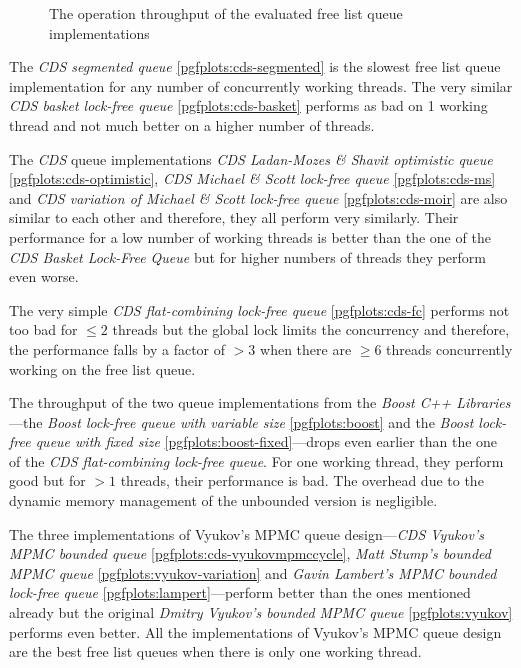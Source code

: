 \begin{@empty}
\begin{figure}[ht!]
{
        }
        \caption{The operation throughput of the evaluated free list queue implementations}
        \label{fig:free_list_performance}
    \end{figure}

    The \emph{CDS segmented queue} \ref{pgfplots:cds-segmented} is the slowest free list queue implementation for any number of concurrently working threads. The very similar \emph{CDS basket lock-free queue} \ref{pgfplots:cds-basket} performs as bad on 1 working thread and not much better on a higher number of threads.

    The \emph{CDS} queue implementations \emph{CDS Ladan-Mozes \& Shavit optimistic queue} \ref{pgfplots:cds-optimistic}, \emph{CDS Michael \& Scott lock-free queue} \ref{pgfplots:cds-ms} and \emph{CDS variation of Michael \& Scott lock-free queue} \ref{pgfplots:cds-moir} are also similar to each other and therefore, they all perform very similarly. Their performance for a low number of working threads is better than the one of the \emph{CDS Basket Lock-Free Queue} but for higher numbers of threads they perform even worse.

    The very simple \emph{CDS flat-combining lock-free queue} \ref{pgfplots:cds-fc} performs not too bad for $\leq 2$ threads but the global lock limits the concurrency and therefore, the performance falls by a factor of $>3$ when there are $\geq6$ threads concurrently working on the free list queue.

    The throughput of the two queue implementations from the \textit{Boost C++ Libraries}---the \emph{Boost lock-free queue with variable size} \ref{pgfplots:boost} and the \emph{Boost lock-free queue with fixed size} \ref{pgfplots:boost-fixed}---drops even earlier than the one of the \emph{CDS flat-combining lock-free queue}. For one working thread, they perform good but for $>1$ threads, their performance is bad. The overhead due to the dynamic memory management of the unbounded version is negligible.

    The three implementations of Vyukov's MPMC queue design---\emph{CDS Vyukov's MPMC bounded queue} \ref{pgfplots:cds-vyukovmpmccycle}, \emph{Matt Stump's bounded MPMC queue} \ref{pgfplots:vyukov-variation} and \emph{Gavin Lambert's MPMC bounded lock-free queue} \ref{pgfplots:lampert}---perform better than the ones mentioned already but the original \emph{Dmitry Vyukov's bounded MPMC queue} \ref{pgfplots:vyukov} performs even better. All the implementations of Vyukov's MPMC queue design are the best free list queues when there is only one working thread.


\end{@empty}
